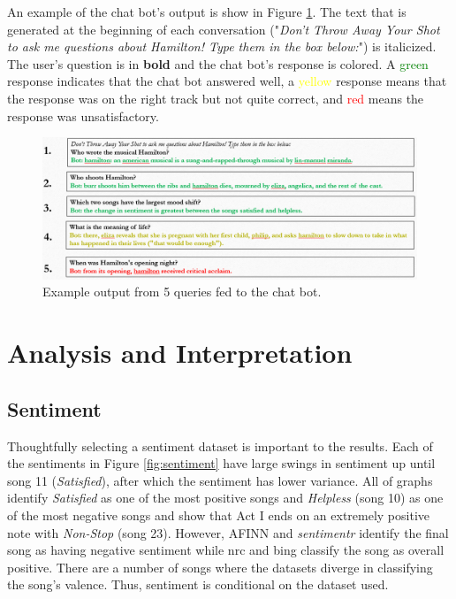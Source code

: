 \documentclass{article}
\begin{document}
An example of the chat bot's output is show in Figure \ref{fig:chat_bot}. The text that is generated at the beginning of each conversation ("\emph{Don't Throw Away Your Shot to ask me questions about Hamilton! Type them in the box below:}") is italicized. The user's question is in \textbf{bold} and the chat bot's response is colored. A \textcolor{green}{green} response indicates that the chat bot answered well, a \textcolor{yellow}{yellow} response means that the response was on the right track but not quite correct, and \textcolor{red}{red} means the response was unsatisfactory. 

\begin{figure}[h]
    \caption{Example output from 5 queries fed to the chat bot. \label{fig:chat_bot}}
    \centering
    \includegraphics[width=0.2\paperwidth]{chat_bot_output.png}
\end{figure}


\section{Analysis and Interpretation}

\subsection{Sentiment}

Thoughtfully selecting a sentiment dataset is important to the results. Each of the sentiments in Figure \ref{fig:sentiment} have large swings in sentiment up until song 11 (\emph{Satisfied}), after which the sentiment has lower variance. All of graphs identify \emph{Satisfied} as one of the most positive songs and \emph{Helpless} (song 10) as one of the most negative songs and show that Act I ends on an extremely positive note with \emph{Non-Stop} (song 23). However, AFINN and \emph{sentimentr} identify the final song as having negative sentiment while nrc and bing classify the song as overall positive. There are a number of songs where the datasets diverge in classifying the song's valence. Thus, sentiment is conditional on the dataset used.
\end{document}
